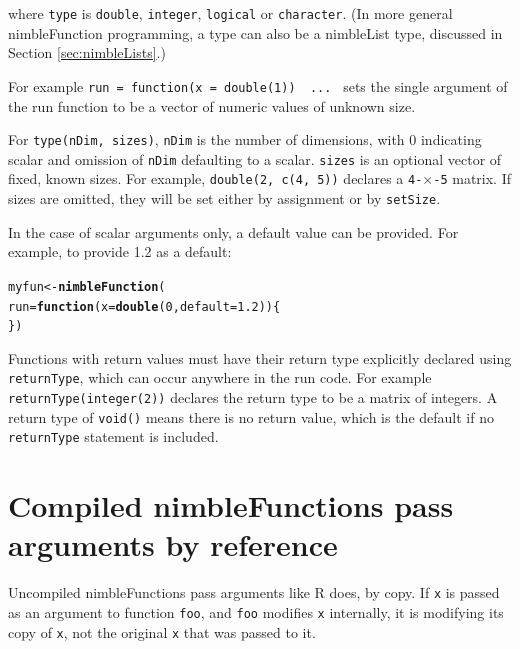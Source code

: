 \documentclass[12pt,oneside]{book}\usepackage[]{graphicx}\usepackage[]{color}
\makeatletter
\newcommand{\hlnum}[1]{\textcolor[rgb]{0.686,0.059,0.569}{#1}}%
\newcommand{\hlstd}[1]{\textcolor[rgb]{0.345,0.345,0.345}{#1}}%
\newcommand{\hlkwa}[1]{\textcolor[rgb]{0.161,0.373,0.58}{\textbf{#1}}}%
\newcommand{\hlkwb}[1]{\textcolor[rgb]{0.69,0.353,0.396}{#1}}%
\newcommand{\hlkwc}[1]{\textcolor[rgb]{0.333,0.667,0.333}{#1}}%
\newcommand{\hlkwd}[1]{\textcolor[rgb]{0.737,0.353,0.396}{\textbf{#1}}}%
\newenvironment{kframe}{%
 \def\at@end@of@kframe{}%
 \ifinner\ifhmode%
  \def\at@end@of@kframe{\end{minipage}}%
  \begin{minipage}{\columnwidth}%
 \fi\fi%
 \def\FrameCommand##1{\hskip\@totalleftmargin \hskip-\fboxsep
 \colorbox{shadecolor}{##1}\hskip-\fboxsep
     \hskip-\linewidth \hskip-\@totalleftmargin \hskip\columnwidth}%
 \MakeFramed {\advance\hsize-\width
   \@totalleftmargin\z@ \linewidth\hsize
   \@setminipage}}%
 {\par\unskip\endMakeFramed%
 \at@end@of@kframe}
\newenvironment{knitrout}{}{} %
\def\cd#1{\texttt{#1}}
\makeatother
\begin{document}
where \cd{type} is \cd{double}, \cd{integer}, \cd{logical} or \cd{character}. 
(In more general nimbleFunction programming, a type can also be a
nimbleList type, discussed in Section \ref{sec:nimbleLists}.)

For example \cd{run = function(x = double(1)) { ... }} sets the single argument of the run function to be a vector of numeric values of unknown size.

For \cd{type(nDim, sizes)}, \cd{nDim} is the number of dimensions, with 0 indicating scalar and omission of \cd{nDim} defaulting to a scalar.
\cd{sizes} is an optional vector of fixed, known sizes.  
 For example, \cd{double(2,
  c(4, 5))} declares a \cd{4-$\times$-5} matrix.  If sizes
are omitted, they will be set either by assignment or by \cd{setSize}.

In the case of scalar arguments only, a default value can be
provided.  For example, to provide 1.2 as a default:

\begin{knitrout}
\color{fgcolor}\begin{kframe}
\begin{alltt}
\hlstd{myfun} \hlkwb{<-} \hlkwd{nimbleFunction}\hlstd{(}
    \hlkwc{run} \hlstd{=} \hlkwa{function}\hlstd{(}\hlkwc{x} \hlstd{=} \hlkwd{double}\hlstd{(}\hlnum{0}\hlstd{,} \hlkwc{default} \hlstd{=} \hlnum{1.2}\hlstd{)) \{}
\hlstd{\})}
\end{alltt}
\end{kframe}
\end{knitrout}

Functions with return values must have their return type explicitly declared using \cd{returnType}, which can occur anywhere in the run code. For example \cd{returnType(integer(2))} declares the return type to be a matrix of integers. A return type of \cd{void()} means there is
no return value, which is the default if no \cd{returnType} statement
is included.  



\section{Compiled nimbleFunctions pass arguments by reference}
\label{sec:comp-nimbl-pass}

Uncompiled nimbleFunctions pass arguments like R does, by copy.  If
\cd{x} is passed as an argument to function \cd{foo}, and \cd{foo}
modifies \cd{x} internally, it is modifying its copy of \cd{x}, not
the original \cd{x} that was passed to it.  
\end{document}
